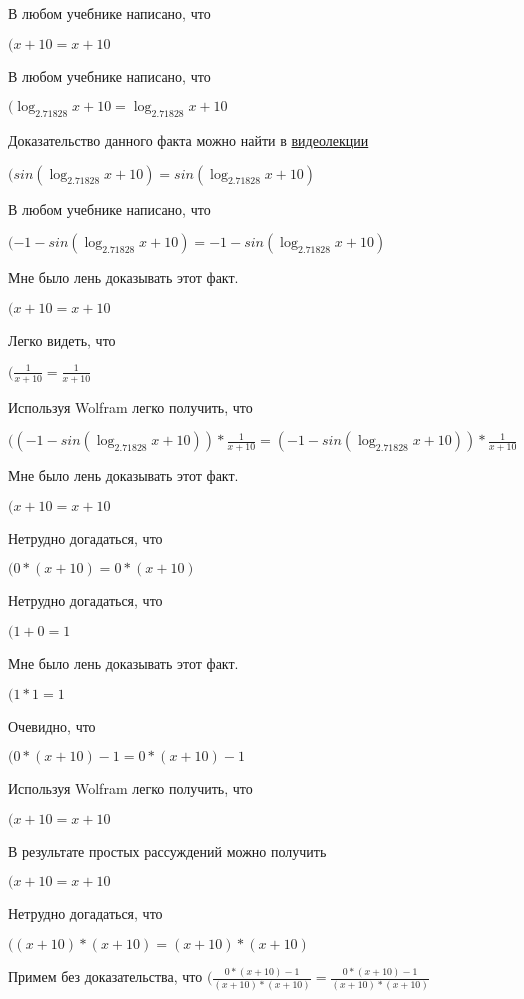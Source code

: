 \documentclass[12pt,a4paper,fleqn]{article}
\theoremstyle{definition}
\begin{document}
В любом учебнике написано, что

$( x  +  10  =  x  +  10 $

В любом учебнике написано, что

$(\log_{ 2.71828 }{ x  +  10 } = \log_{ 2.71828 }{ x  +  10 }$

Доказательство данного факта можно найти в \href{https://www.youtube.com/watch?v=dQw4w9WgXcQ}{видеолекции}

$(sin(\log_{ 2.71828 }{ x  +  10 }) = sin(\log_{ 2.71828 }{ x  +  10 })$

В любом учебнике написано, что

$( -1  - sin(\log_{ 2.71828 }{ x  +  10 }) =  -1  - sin(\log_{ 2.71828 }{ x  +  10 })$

Мне было лень доказывать этот факт.

$( x  +  10  =  x  +  10 $

Легко видеть, что

$(\frac{ 1 }{ x  +  10 }
 = \frac{ 1 }{ x  +  10 }
$

Используя Wolfram легко получить, что

$(( -1  - sin(\log_{ 2.71828 }{ x  +  10 })) * \frac{ 1 }{ x  +  10 }
 = ( -1  - sin(\log_{ 2.71828 }{ x  +  10 })) * \frac{ 1 }{ x  +  10 }
$

Мне было лень доказывать этот факт.

$( x  +  10  =  x  +  10 $

Нетрудно догадаться, что

$( 0  * ( x  +  10 ) =  0  * ( x  +  10 )$

Нетрудно догадаться, что

$( 1  +  0  =  1 $

Мне было лень доказывать этот факт.

$( 1  *  1  =  1 $

Очевидно, что

$( 0  * ( x  +  10 ) -  1  =  0  * ( x  +  10 ) -  1 $

Используя Wolfram легко получить, что

$( x  +  10  =  x  +  10 $

В результате простых рассуждений можно получить

$( x  +  10  =  x  +  10 $

Нетрудно догадаться, что

$(( x  +  10 ) * ( x  +  10 ) = ( x  +  10 ) * ( x  +  10 )$

Примем без доказательства, что
$(\frac{ 0  * ( x  +  10 ) -  1 }{( x  +  10 ) * ( x  +  10 )}
 = \frac{ 0  * ( x  +  10 ) -  1 }{( x  +  10 ) * ( x  +  10 )}
$
\end{document}
